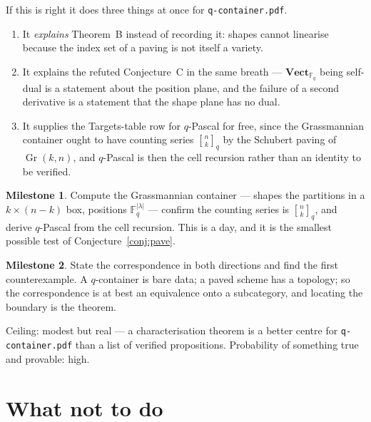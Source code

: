 \documentclass[11pt,a4paper]{article}
\theoremstyle{definition}
\newtheorem{milestone}{Milestone}
\theoremstyle{remark}
\newcommand{\FF}{\mathbb{F}}
\newcommand{\cat}[1]{\mathbf{#1}}
\newcommand{\Vect}{\cat{Vect}}
\DeclareMathOperator{\Gr}{Gr}
\newcommand{\qbin}[2]{\genfrac{[}{]}{0pt}{}{#1}{#2}_{q}}
\begin{document}
If this is right it does three things at once for \texttt{q-container.pdf}.

\begin{enumerate}[nosep,label=\arabic*.]
\item It \emph{explains} Theorem~B instead of recording it: shapes cannot
linearise because the index set of a paving is not itself a variety.
\item It explains the refuted Conjecture~C in the same breath --- $\Vect_{\FF_q}$
being self-dual is a statement about the position plane, and the failure of a
second derivative is a statement that the shape plane has no dual.
\item It supplies the Targets-table row for $q$-Pascal for free, since the
Grassmannian container ought to have counting series $\qbin{n}{k}$ by the
Schubert paving of $\Gr(k,n)$, and $q$-Pascal is then the cell recursion rather
than an identity to be verified.
\end{enumerate}

\begin{milestone}\label{m:C1}
Compute the Grassmannian container --- shapes the partitions in a $k \times
(n-k)$ box, positions $\FF_q^{|\lambda|}$ --- confirm the counting series is
$\qbin{n}{k}$, and derive $q$-Pascal from the cell recursion. This is a day, and
it is the smallest possible test of Conjecture~\ref{conj:pave}.
\end{milestone}

\begin{milestone}\label{m:C2}
State the correspondence in both directions and find the first counterexample.
A $q$-container is bare data; a paved scheme has a topology; so the
correspondence is at best an equivalence onto a subcategory, and locating the
boundary is the theorem.
\end{milestone}

Ceiling: modest but real --- a characterisation theorem is a better centre for
\texttt{q-container.pdf} than a list of verified propositions. Probability of
something true and provable: high.

\section{What not to do}\label{sec:not}
\end{document}

